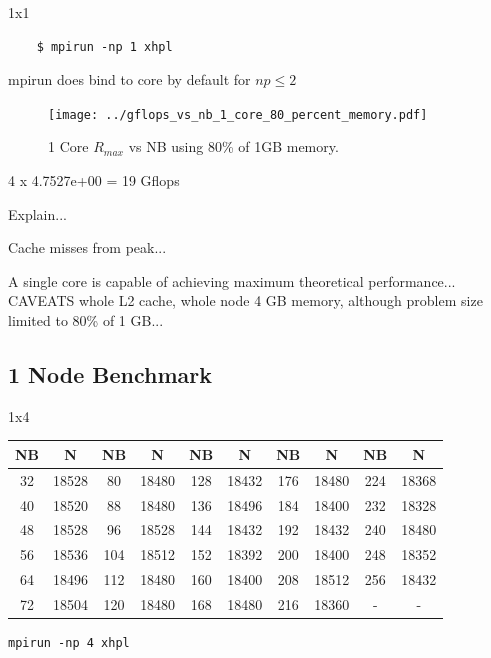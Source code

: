 \documentclass{article}
\begin{document}
1x1

\begin{verbatim}
    $ mpirun -np 1 xhpl
\end{verbatim}

mpirun does bind to core by default for $np \leq 2$

\begin{figure}
	\centering	
	\texttt{[image: ../gflops\_vs\_nb\_1\_core\_80\_percent\_memory.pdf]}
	\caption{1 Core $R_{max}$ vs NB using 80\% of 1GB memory.}
\end{figure}

4 x 4.7527e+00 = 19 Gflops

Explain...

Cache misses from peak...

A single core is capable of achieving maximum theoretical performance... CAVEATS whole L2 cache, whole node 4 GB memory, although problem size limited to 80\% of 1 GB...  


\subsection{1 Node Benchmark}

1x4

\begin{center}
	\begin{tabular}{ |c|c|c|c|c|c|c|c|c|c| } 
		\hline
		NB & N & NB & N & NB & N & NB & N & NB & N \\ 
		\hline
		32 & 18528 &  80 & 18480 & 128 & 18432 & 176 & 18480 & 224 & 18368 \\ 
		40 & 18520 &  88 & 18480 & 136 & 18496 & 184 & 18400 & 232 & 18328 \\ 
 		48 & 18528 &  96 & 18528 & 144 & 18432 & 192 & 18432 & 240 & 18480 \\
		56 & 18536 & 104 & 18512 & 152 & 18392 & 200 & 18400 & 248 & 18352 \\ 
 		64 & 18496 & 112 & 18480 & 160 & 18400 & 208 & 18512 & 256 & 18432 \\
		72 & 18504 & 120 & 18480 & 168 & 18480 & 216 & 18360 &   - &     - \\ 
 		\hline
	\end{tabular}
\end{center}

\begin{lstlisting}[]
mpirun -np 4 xhpl
\end{lstlisting}
\end{document}
